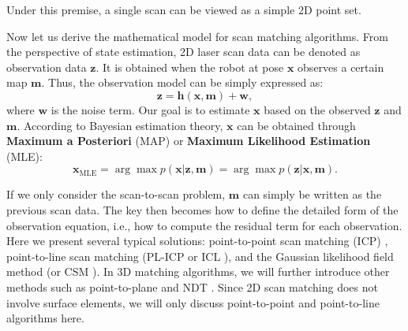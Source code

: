 Under this premise, a single scan can be viewed as a simple 2D point set.

Now let us derive the mathematical model for scan matching algorithms. From the perspective of state estimation, 2D laser scan data can be denoted as observation data $\mathbf{z}$. It is obtained when the robot at pose $\mathbf{x}$ observes a certain map $\mathbf{m}$. Thus, the observation model can be simply expressed as:
\begin{equation}\label{key}
	\mathbf{z} = \mathbf{h} (\mathbf{x}, \mathbf{m}) + \mathbf{w},
\end{equation}
where $\mathbf{w}$ is the noise term. Our goal is to estimate $\mathbf{x}$ based on the observed $\mathbf{z}$ and $\mathbf{m}$. According to Bayesian estimation theory, $\mathbf{x}$ can be obtained through \textbf{Maximum a Posteriori} (MAP) or \textbf{Maximum Likelihood Estimation} (MLE):
\begin{equation}\label{key}
	\mathbf{x}_{\mathrm{MLE}} = \arg \max p(\mathbf{x}|\mathbf{z}, \mathbf{m}) = \arg \max p(\mathbf{z}|\mathbf{x}, \mathbf{m}).
\end{equation}

If we only consider the scan-to-scan problem, $\mathbf{m}$ can simply be written as the previous scan data. The key then becomes how to define the detailed form of the observation equation, i.e., how to compute the residual term for each observation. Here we present several typical solutions: point-to-point scan matching (ICP) \cite{Arun1987}, point-to-line scan matching (PL-ICP \cite{Censi2008} or ICL \cite{Alshawa2007}), and the Gaussian likelihood field method (or CSM \cite{Olson2009}). In 3D matching algorithms, we will further introduce other methods such as point-to-plane \cite{Park2003,Low2004} and NDT \cite{Biber2003,Magnusson2009,Rapp2015}. Since 2D scan matching does not involve surface elements, we will only discuss point-to-point and point-to-line algorithms here.

